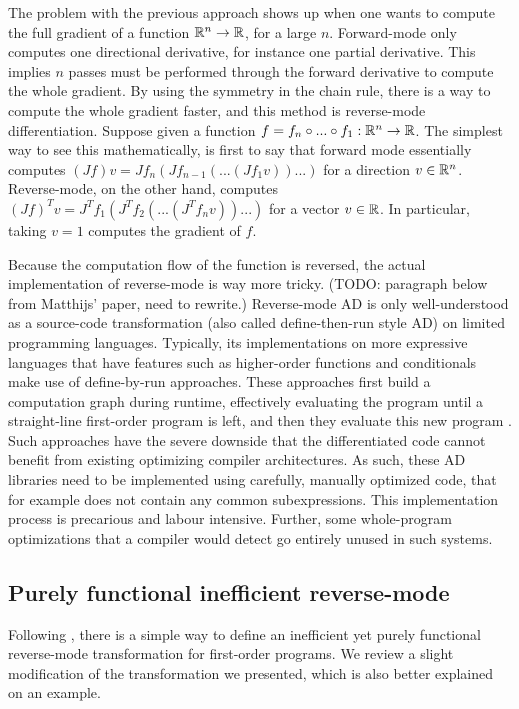The problem with the previous approach shows up when one wants to compute the full gradient of a function $\mathbb{R}^n\to\mathbb{R}$, for a large $n$. 
Forward-mode only computes one directional derivative, for instance one partial derivative. This implies $n$ passes must be performed through the forward derivative to compute the whole gradient.
By using the symmetry in the chain rule, there is a way to compute the whole gradient faster, and this method is reverse-mode differentiation.
Suppose given a function $f=f_n\circ...\circ f_1 :\mathbb{R}^n\to\mathbb{R}$. 
The simplest way to see this mathematically, is first to say that forward mode essentially computes $(Jf)v=Jf_n(Jf_{n-1}(...(Jf_1v))...)$ for a direction $v\in\mathbb{R}^n$. 
Reverse-mode, on the other hand, computes $(Jf)^Tv =J^Tf_1(J^Tf_{2}(...(J^Tf_nv))...)$ for a vector $v\in\mathbb{R}$.
In particular, taking $v=1$ computes the gradient of $f$.

Because the computation flow of the function is reversed, the actual implementation of reverse-mode is way more tricky. 
(TODO: paragraph below from Matthijs' paper, need to rewrite.)
Reverse-mode AD is only well-understood as a source-code transformation 
(also called define-then-run style AD) on limited programming languages. 
Typically, its implementations on more expressive languages that have features such as higher-order functions and conditionals
make use of define-by-run approaches. 
These approaches first build a computation graph during runtime, effectively evaluating the program until a straight-line
first-order program is left, and then they evaluate this new program \cite{carpenter2015stan,paszke2017automatic}. 
Such approaches have the severe downside that the differentiated code cannot benefit from existing optimizing compiler architectures. 
As such, these AD libraries need to be implemented using carefully, manually optimized code, that for example does not contain any common subexpressions. 
This implementation process is precarious and labour intensive. 
Further, some whole-program optimizations that a compiler would detect go entirely unused in such systems.

\subsection{Purely functional inefficient reverse-mode}

Following \cite{pearlmutter2008reverse}, there is a simple way to define an inefficient yet purely functional reverse-mode transformation for first-order programs.
We review a slight modification of the transformation we presented, which is also better explained on an example. 

